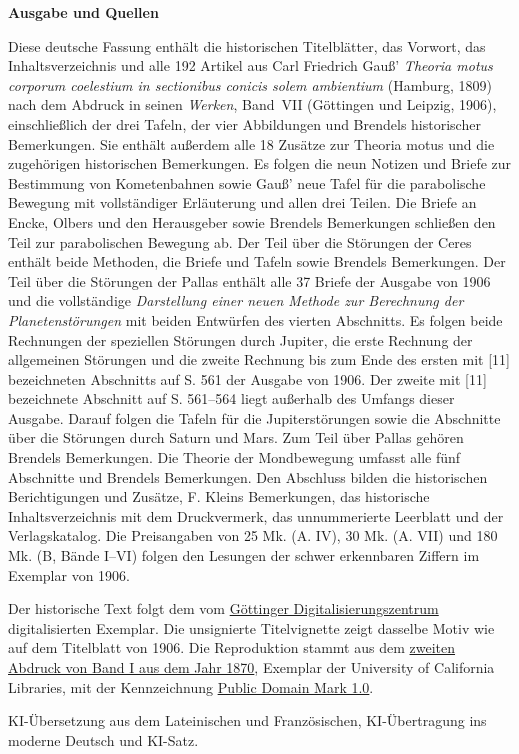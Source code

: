 \clearpage
\thispagestyle{empty}
\begin{center}\textbf{Ausgabe und Quellen}\end{center}
\noindent Diese deutsche Fassung enthält die historischen Titelblätter, das Vorwort, das Inhaltsverzeichnis und alle 192 Artikel aus Carl Friedrich Gauß’ \textit{Theoria motus corporum coelestium in sectionibus conicis solem ambientium} (Hamburg, 1809) nach dem Abdruck in seinen \textit{Werken}, Band~VII (Göttingen und Leipzig, 1906), einschließlich der drei Tafeln, der vier Abbildungen und Brendels historischer Bemerkungen. Sie enthält außerdem alle 18 Zusätze zur Theoria motus und die zugehörigen historischen Bemerkungen. Es folgen die neun Notizen und Briefe zur Bestimmung von Kometenbahnen sowie Gauß’ neue Tafel für die parabolische Bewegung mit vollständiger Erläuterung und allen drei Teilen. Die Briefe an Encke, Olbers und den Herausgeber sowie Brendels Bemerkungen schließen den Teil zur parabolischen Bewegung ab. Der Teil über die Störungen der Ceres enthält beide Methoden, die Briefe und Tafeln sowie Brendels Bemerkungen. Der Teil über die Störungen der Pallas enthält alle 37 Briefe der Ausgabe von 1906 und die vollständige \textit{Darstellung einer neuen Methode zur Berechnung der Planetenstörungen} mit beiden Entwürfen des vierten Abschnitts. Es folgen beide Rechnungen der speziellen Störungen durch Jupiter, die erste Rechnung der allgemeinen Störungen und die zweite Rechnung bis zum Ende des ersten mit [11] bezeichneten Abschnitts auf S. 561 der Ausgabe von 1906. Der zweite mit [11] bezeichnete Abschnitt auf S. 561–564 liegt außerhalb des Umfangs dieser Ausgabe. Darauf folgen die Tafeln für die Jupiterstörungen sowie die Abschnitte über die Störungen durch Saturn und Mars. Zum Teil über Pallas gehören Brendels Bemerkungen. Die Theorie der Mondbewegung umfasst alle fünf Abschnitte und Brendels Bemerkungen. Den Abschluss bilden die historischen Berichtigungen und Zusätze, F. Kleins Bemerkungen, das historische Inhaltsverzeichnis mit dem Druckvermerk, das unnummerierte Leerblatt und der Verlagskatalog. Die Preisangaben von 25 Mk. (A. IV), 30 Mk. (A. VII) und 180 Mk. (B, Bände I–VI) folgen den Lesungen der schwer erkennbaren Ziffern im Exemplar von 1906. 
\par\medskip\noindent Der historische Text folgt dem vom \href{https://gdz.sub.uni-goettingen.de/id/PPN236008730}{Göttinger Digitalisierungszentrum} digitalisierten Exemplar. Die unsignierte Titelvignette zeigt dasselbe Motiv wie auf dem Titelblatt von 1906. Die Reproduktion stammt aus dem \href{https://commons.wikimedia.org/w/index.php?oldid=1179960952}{zweiten Abdruck von Band I aus dem Jahr 1870}, Exemplar der University of California Libraries, mit der Kennzeichnung \href{https://creativecommons.org/publicdomain/mark/1.0/}{Public Domain Mark 1.0}.
\par\medskip\noindent KI-Übersetzung aus dem Lateinischen und Französischen, KI-Übertragung ins moderne Deutsch und KI-Satz.
